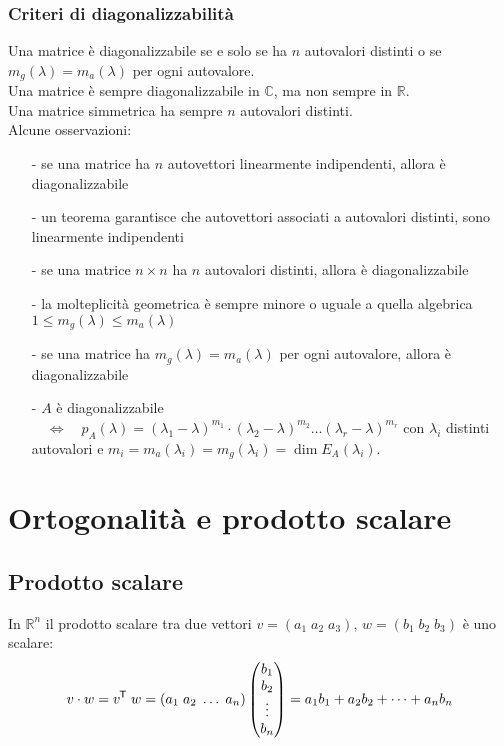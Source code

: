 \documentclass[a4paper]{article}
\newcommand\tran{^{\mkern-1.5mu\mathsf{T}}} %
\begin{document}
\subsubsection*{Criteri di diagonalizzabilità}
Una matrice è diagonalizzabile se e solo se ha \(n\) autovalori distinti o se \(m_g(\lambda) = m_a(\lambda)\) per ogni autovalore. \\
Una matrice è sempre diagonalizzabile in \(\mathbb{C}\), ma non sempre in \(\mathbb{R}\). \\
Una matrice simmetrica ha sempre \(n\) autovalori distinti. \\
Alcune osservazioni:
\begin{itemize}[topsep=3pt, itemsep=0pt]
	\item[-] se una matrice ha \(n\) autovettori linearmente indipendenti, allora è diagonalizzabile
	\item[-] un teorema garantisce che autovettori associati a autovalori distinti, sono linearmente indipendenti
	\item[-] se una matrice \(n \times n\) ha \(n\) autovalori distinti, allora è diagonalizzabile
	\item[-] la molteplicità geometrica è sempre minore o uguale a quella algebrica \(1 \leq m_g(\lambda) \leq m_a(\lambda)\)
	\item[-] se una matrice ha \(m_g(\lambda) = m_a(\lambda)\) per ogni autovalore, allora è diagonalizzabile
	\item[-] \(A\) è diagonalizzabile \(\quad \Leftrightarrow \quad p_A(\lambda) = (\lambda_1-\lambda)^{m_1} \cdot (\lambda_2-\lambda)^{m_2} \dots (\lambda_r-\lambda)^{m_r}\)
	con \(\lambda_i\) distinti autovalori e \(m_i = m_a(\lambda_i) = m_g(\lambda_i) = \dim E_A(\lambda_i)\).
\end{itemize}

\newpage


\section{Ortogonalità e prodotto scalare}
\subsection{Prodotto scalare}
In \(\mathbb{R}^n\) il prodotto scalare tra due vettori \(v = (a_1 \; a_2 \; a_3)\), \(w = (b_1 \; b_2 \; b_3)\) è uno scalare:
\[v \cdot w = v \tran \; w =(a_1 \; a_2 \; \dots \; a_n) \left(\begin{matrix} b_1 \\ b_2 \\ \vdots \\ b_n \end{matrix}\right) = a_1b_1 + a_2b_2 + \dots + a_nb_n\]
\end{document}

